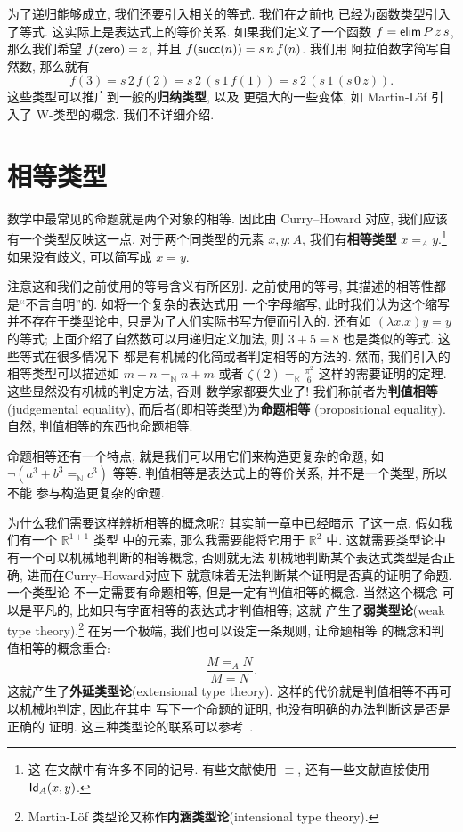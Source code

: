 为了递归能够成立, 我们还要引入相关的等式. 我们在之前也
已经为函数类型引入了等式. 这实际上是表达式上的等价关系.
如果我们定义了一个函数 \(f = \textsf{elim}\,P\,z\,s\),
那么我们希望 \(f(\textsf{zero}) = z\), 并且
\(f(\textsf{succ}(n)) = s\,n\,f(n)\). 我们用
阿拉伯数字简写自然数, 那么就有
\[f(3) = s\,2\,f(2) = s\,2\,(s\,1\,f(1)) = s\,2\,(s\,1\,(s\,0\,z)).\]
这些类型可以推广到一般的\textbf{归纳类型}, 以及
更强大的一些变体, 如 Martin-L\"of 引入了 W-类型的概念.
我们不详细介绍.

\section{相等类型}\label{martinlof:identity}
数学中最常见的命题就是两个对象的相等. 因此由 Curry--Howard
对应, 我们应该有一个类型反映这一点. 对于两个同类型的元素
\(x,y : A\), 我们有\textbf{相等类型} \(x =_A y\).\footnote{这
在文献中有许多不同的记号. 有些文献使用 \(\equiv\),
还有一些文献直接使用 \(\textsf{Id}_A(x,y)\).}
如果没有歧义, 可以简写成 \(x = y\).

注意这和我们之前使用的等号含义有所区别. 之前使用的等号,
其描述的相等性都是“不言自明”的. 如将一个复杂的表达式用
一个字母缩写, 此时我们认为这个缩写并不存在于类型论中,
只是为了人们实际书写方便而引入的. 还有如 \((\lambda x.x)y = y\)
的等式; 上面介绍了自然数可以用递归定义加法, 则
\(3 + 5 = 8\) 也是类似的等式. 这些等式在很多情况下
都是有机械的化简或者判定相等的方法的. 然而, 我们引入的
相等类型可以描述如 \(m + n =_{\mathbb N} n + m\) 或者 \(\zeta(2) =_{\mathbb R} \frac{\pi^2}{6}\)
这样的需要证明的定理. 这些显然没有机械的判定方法, 否则
数学家都要失业了!
我们称前者为\textbf{判值相等} (judgemental equality),
而后者(即相等类型)为\textbf{命题相等} (propositional equality).
自然, 判值相等的东西也命题相等.

命题相等还有一个特点, 就是我们可以用它们来构造更复杂的命题,
如 \(\neg (a^3 + b^3 =_{\mathbb N} c^3)\) 等等.
判值相等是表达式上的等价关系, 并不是一个类型, 所以不能
参与构造更复杂的命题.

为什么我们需要这样辨析相等的概念呢? 其实前一章中已经暗示
了这一点. 假如我们有一个 \(\mathbb R^{1+1}\) 类型
中的元素, 那么我需要能将它用于 \(\mathbb R^2\) 中.
这就需要类型论中有一个可以机械地判断的相等概念, 否则就无法
机械地判断某个表达式类型是否正确, 进而在Curry--Howard对应下
就意味着无法判断某个证明是否真的证明了命题. 一个类型论
不一定需要有命题相等, 但是一定有判值相等的概念. 当然这个概念
可以是平凡的, 比如只有字面相等的表达式才判值相等; 这就
产生了\textbf{弱类型论}(weak type theory).\footnote{Martin-L\"of
类型论又称作\textbf{内涵类型论}(intensional
type theory).} 在另一个极端, 我们也可以设定一条规则, 让命题相等
的概念和判值相等的概念重合:
\[\frac{M =_A N}{M = N}.\]
这就产生了\textbf{外延类型论}(extensional type theory).
这样的代价就是判值相等不再可以机械地判定, 因此在其中
写下一个命题的证明, 也没有明确的办法判断这是否是正确的
证明. 这三种类型论的联系可以参考~\cite{winterhalter:2018:ettwtt}.

